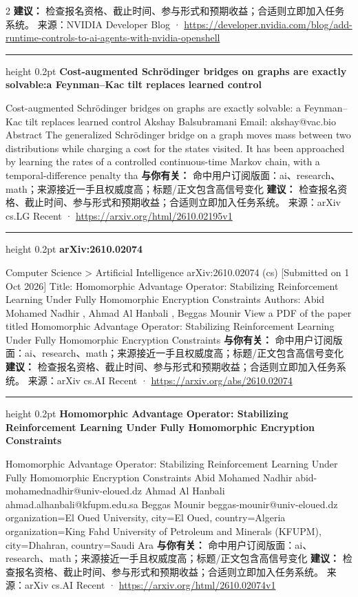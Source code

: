 \documentclass[10.5pt]{ctexart}
\begin{document}
\begin{multicols}{2}
\textbf{建议：} 检查报名资格、截止时间、参与形式和预期收益；合适则立即加入任务系统。
{\footnotesize\color{ormuted} 来源：NVIDIA Developer Blog · \url{https://developer.nvidia.com/blog/add-runtime-controls-to-ai-agents-with-nvidia-openshell}}
\vspace{2mm}
\hrule height 0.2pt
\vspace{2mm}
{\large\bfseries Cost-augmented Schrödinger bridges on graphs are exactly solvable:a Feynman–Kac tilt replaces learned control}\par
Cost-augmented Schrödinger bridges on graphs are exactly solvable: a Feynman–Kac tilt replaces learned control Akshay Balsubramani Email: akshay@vac.bio Abstract The generalized Schrödinger bridge on a graph moves mass between two distributions while charging a cost for the states visited. It has been approached by learning the rates of a controlled continuous-time Markov chain, with a temporal-difference penalty tha
\textbf{与你有关：} 命中用户订阅版面：ai、research、math；来源接近一手且权威度高；标题/正文包含高信号变化
\textbf{建议：} 检查报名资格、截止时间、参与形式和预期收益；合适则立即加入任务系统。
{\footnotesize\color{ormuted} 来源：arXiv cs.LG Recent · \url{https://arxiv.org/html/2610.02195v1}}
\vspace{2mm}
\hrule height 0.2pt
\vspace{2mm}
{\large\bfseries arXiv:2610.02074}\par
Computer Science > Artificial Intelligence arXiv:2610.02074 (cs) [Submitted on 1 Oct 2026] Title: Homomorphic Advantage Operator: Stabilizing Reinforcement Learning Under Fully Homomorphic Encryption Constraints Authors: Abid Mohamed Nadhir , Ahmad Al Hanbali , Beggas Mounir View a PDF of the paper titled Homomorphic Advantage Operator: Stabilizing Reinforcement Learning Under Fully Homomorphic Encryption Constraints
\textbf{与你有关：} 命中用户订阅版面：ai、research、math；来源接近一手且权威度高；标题/正文包含高信号变化
\textbf{建议：} 检查报名资格、截止时间、参与形式和预期收益；合适则立即加入任务系统。
{\footnotesize\color{ormuted} 来源：arXiv cs.AI Recent · \url{https://arxiv.org/abs/2610.02074}}
\vspace{2mm}
\hrule height 0.2pt
\vspace{2mm}
{\large\bfseries Homomorphic Advantage Operator: Stabilizing Reinforcement Learning Under Fully Homomorphic Encryption Constraints}\par
Homomorphic Advantage Operator: Stabilizing Reinforcement Learning Under Fully Homomorphic Encryption Constraints Abid Mohamed Nadhir abid-mohamednadhir@univ-eloued.dz Ahmad Al Hanbali ahmad.alhanbali@kfupm.edu.sa Beggas Mounir beggas-mounir@univ-eloued.dz organization=El Oued University, city=El Oued, country=Algeria organization=King Fahd University of Petroleum and Minerals (KFUPM), city=Dhahran, country=Saudi Ara
\textbf{与你有关：} 命中用户订阅版面：ai、research、math；来源接近一手且权威度高；标题/正文包含高信号变化
\textbf{建议：} 检查报名资格、截止时间、参与形式和预期收益；合适则立即加入任务系统。
{\footnotesize\color{ormuted} 来源：arXiv cs.AI Recent · \url{https://arxiv.org/html/2610.02074v1}}
\end{multicols}
\end{document}
